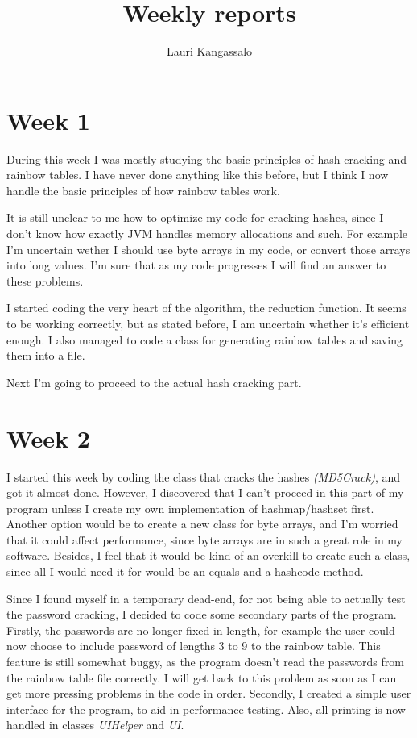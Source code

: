 \documentclass[a4paper, 11pt, finnish]{article}
\title{Weekly reports}
\author{Lauri Kangassalo}
\begin{document}
  \maketitle
\section*{Week 1}
During this week I was mostly studying the basic principles of hash cracking and rainbow tables. I have never done anything like this before, but I think I now handle the basic principles of how rainbow tables work.

It is still unclear to me how to optimize my code for cracking hashes, since I don't know how exactly JVM handles memory allocations and such. For example I'm uncertain wether I should use byte arrays in my code, or convert those arrays into long values. I'm sure that as my code progresses I will find an answer to these problems.

I started coding the very heart of the algorithm, the reduction function. It seems to be working correctly, but as stated before, I am uncertain whether it's efficient enough. I also managed to code a class for generating rainbow tables and saving them into a file.

Next I'm going to proceed to the actual hash cracking part.

\section*{Week 2}
I started this week by coding the class that cracks the hashes \emph{(MD5Crack)}, and got it almost done. However, I discovered that I can't proceed in this part of my program unless I create my own implementation of hashmap/hashset first. Another option would be to create a new class for byte arrays, and I'm worried that it could affect performance, since byte arrays are in such a great role in my software. Besides, I feel that it would be kind of an overkill to create such a class, since all I would need it for would be an equals and a hashcode method.

Since I found myself in a temporary dead-end, for not being able to actually test the password cracking, I decided to code some secondary parts of the program. Firstly, the passwords are no longer fixed in length, for example the user could now choose to include password of lengths 3 to 9 to the rainbow table. This feature is still somewhat buggy, as the program doesn't read the passwords from the rainbow table file correctly. I will get back to this problem as soon as I can get more pressing problems in the code in order. Secondly, I created a simple user interface for the program, to aid in performance testing. Also, all printing is now handled in classes \emph{UIHelper} and \emph{UI}.
\end{document}
